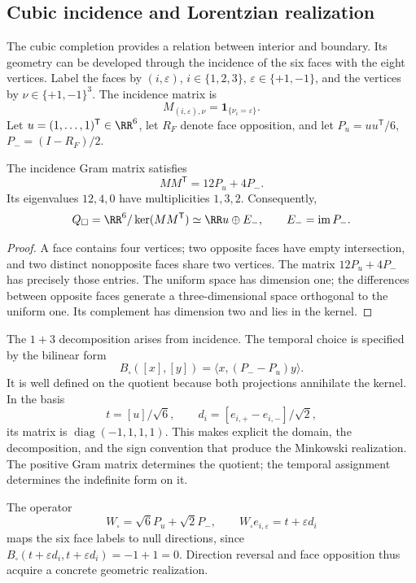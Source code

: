 \subsection{Cubic incidence and Lorentzian realization}

The cubic completion provides a relation between interior and boundary.
Its geometry can be developed through the incidence of the six faces
with the eight vertices. Label the faces by \((i,\varepsilon)\),
\(i\in\{1,2,3\}\), \(\varepsilon\in\{+1,-1\}\), and the vertices by
\(\nu\in\{+1,-1\}^3\). The incidence matrix is
\[
 M_{(i,\varepsilon),\nu}=\mathbf1_{\{\nu_i=\varepsilon\}}.
\]
Let \(u=(1,\ldots,1)^{\mathsf T}\in\RR^6\), let \(R_F\) denote face
opposition, and let \(P_u=uu^{\mathsf T}/6\), \(P_-=(I-R_F)/2\).

\begin{proposition}
The incidence Gram matrix satisfies
\[
 MM^{\mathsf T}=12P_u+4P_-.
\]
Its eigenvalues \(12,4,0\) have multiplicities \(1,3,2\).
Consequently,
\[
 Q_\square=\RR^6/\ker(MM^{\mathsf T})
 \simeq\RR u\oplus E_-,\qquad E_-=\operatorname{im}P_-.
\]
\end{proposition}
\begin{proof}
A face contains four vertices; two opposite faces have empty intersection,
and two distinct nonopposite faces share two vertices.
The matrix \(12P_u+4P_-\) has precisely those entries.
The uniform space has dimension one; the differences between opposite
faces generate a three-dimensional space orthogonal to the uniform one.
Its complement has dimension two and lies in the kernel.
\end{proof}

The \(1+3\) decomposition arises from incidence. The temporal choice
is specified by the bilinear form
\[
 B_\square([x],[y])=\langle x,(P_--P_u)y\rangle.
\]
It is well defined on the quotient because both projections annihilate the
kernel. In the basis
\[
 t=[u]/\sqrt6,\qquad
 d_i=[e_{i,+}-e_{i,-}]/\sqrt2,
\]
its matrix is \(\operatorname{diag}(-1,1,1,1)\). This makes explicit
the domain, the decomposition, and the sign convention that produce
the Minkowski realization. The positive Gram matrix determines the quotient;
the temporal assignment determines the indefinite form on it.

The operator
\[
 W_\square=\sqrt6P_u+\sqrt2P_-,\qquad
 W_\square e_{i,\varepsilon}=t+\varepsilon d_i
\]
maps the six face labels to null directions, since
\(B_\square(t+\varepsilon d_i,t+\varepsilon d_i)=-1+1=0\).
Direction reversal and face opposition thus acquire a concrete
geometric realization.

